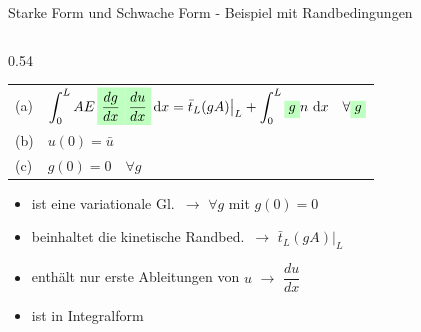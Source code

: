 \documentclass[aspectratio=169,professionalfonts]{beamer}
\newcommand{\hlg}[1]{\text{\colorbox{green!25}{\ensuremath{#1}}}}
\newcommand{\dd}{\,\mathrm{d}}
\begin{document}
\begin{frame}[shrink=5]{Starke Form und Schwache Form - Beispiel mit Randbedingungen}
\begin{columns}[T,onlytextwidth]
\begin{column}{0.54\textwidth}
\begin{tcolorbox}[colback=orange!10, colframe=orange!80!black,
          boxrule=1.5pt, left=4pt, right=4pt, top=2pt, bottom=2pt]
        \small
        \begin{tabular}{@{}l@{\;}l@{}}
          (a) & $\displaystyle\int_0^L AE\,\hlg{\dfrac{dg}{dx}}\hlg{\dfrac{du}{dx}}\dd x
                = \bar{t}_L(gA)\big|_L + \int_0^L \hlg{g}n\,\dd x \quad \forall \hlg{g}$\\[0.8em]
          (b) & $u(0)=\bar{u}$\\[0.3em]
          (c) & $g(0)=0\quad\forall g$
        \end{tabular}
      \end{tcolorbox}
      \vspace{0.2em}
      \begin{itemize}\footnotesize
        \item[(a)] ist eine variationale Gl.\ $\rightarrow$ $\forall g$ mit $g(0)=0$
        \item[(a)] beinhaltet die kinetische Randbed.\ $\rightarrow$ $\bar{t}_L(gA)|_L$
        \item[(a)] enthält nur erste Ableitungen von $u$ $\rightarrow$ $\dfrac{du}{dx}$
        \item[(a)] ist in Integralform
           
      \end{itemize}
    \end{column}
  \end{columns}
\end{frame}
\end{document}
